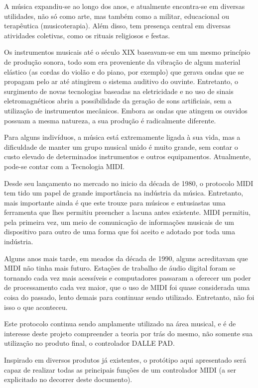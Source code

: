         A música expandiu-se ao longo dos anos, e atualmente encontra-se em diversas utilidades, não só como arte, mas também como a militar, educacional ou terapêutica (musicoterapia). Além disso, tem presença central em diversas atividades coletivas, como os rituais religiosos e festas.~\cite{PPD}

        Os instrumentos musicais até o século XIX baseavam-se em um mesmo princípio de produção sonora, todo som era proveniente da vibração de algum material elástico (as cordas do violão e do piano, por exemplo) que gerava ondas que se propagam pelo ar até atingirem o sistema auditivo do ouvinte. Entretanto, o surgimento de novas tecnologias baseadas na eletricidade e no uso de sinais eletromagnéticos abriu a possibilidade da geração de sons artificiais, sem a utilização de instrumentos mecânicos. Embora as ondas que atingem os ouvidos possuam a mesma natureza, a sua produção é radicalmente diferente.~\cite{SANTINI2005}

        Para alguns indivíduos, a música está extremamente ligada à sua vida, mas a dificuldade de manter um grupo musical unido é muito grande, sem contar o custo elevado de determinados instrumentos e outros equipamentos. Atualmente, pode-se contar com a Tecnologia MIDI.

        Desde seu lançamento no mercado no inicio da década de 1980, o protocolo MIDI tem tido um papel de grande importância na indústria da música. Entretanto, mais importante ainda é que este trouxe para músicos e entusiastas uma ferramenta que lhes permitiu preencher a lacuna antes existente. MIDI permitiu, pela primeira vez, um meio de comunicação de informações musicais de um dispositivo para outro de uma forma que foi aceito e adotado por toda uma indústria.~\cite{Guerin}

        Alguns anos mais tarde, em meados da década de 1990, alguns acreditavam que MIDI não tinha mais futuro. Estações de trabalho de áudio digital foram se tornando cada vez mais acessíveis e computadores passaram a oferecer um poder de processamento cada vez maior, que o uso de MIDI foi quase considerada uma coisa do passado, lento demais para continuar sendo utilizado. Entretanto, não foi isso o que aconteceu.

        Este protocolo continua sendo amplamente utilizado na área musical, e é de interesse deste projeto compreender a teoria por trás do mesmo, não somente sua utilização no produto final, o controlador DALLE PAD.

        Inspirado em diversos produtos já existentes, o protótipo aqui apresentado será capaz de realizar todas as principais funções de um controlador MIDI (a ser explicitado no decorrer deste documento).


